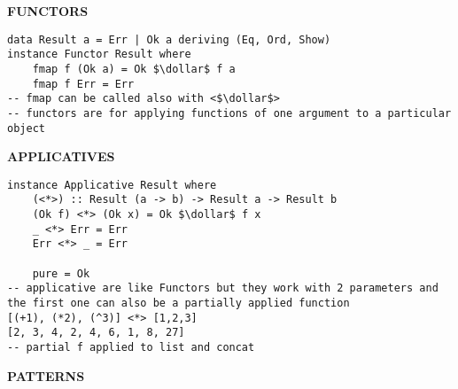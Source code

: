 \documentclass{article}
\newcommand{\dollar}{\mbox{\textdollar}}
\begin{document}
\begin{multicols*}{3}
\hrulefill

\textbf{FUNCTORS}
\begin{lstlisting}
data Result a = Err | Ok a deriving (Eq, Ord, Show)
instance Functor Result where
    fmap f (Ok a) = Ok $\dollar$ f a
    fmap f Err = Err
-- fmap can be called also with <$\dollar$>
-- functors are for applying functions of one argument to a particular object
\end{lstlisting}

\hrulefill

\textbf{APPLICATIVES}
\begin{lstlisting}
instance Applicative Result where
    (<*>) :: Result (a -> b) -> Result a -> Result b
    (Ok f) <*> (Ok x) = Ok $\dollar$ f x
    _ <*> Err = Err
    Err <*> _ = Err

    pure = Ok
-- applicative are like Functors but they work with 2 parameters and the first one can also be a partially applied function
[(+1), (*2), (^3)] <*> [1,2,3]
[2, 3, 4, 2, 4, 6, 1, 8, 27]
-- partial f applied to list and concat
\end{lstlisting}

\hrulefill

\textbf{PATTERNS}
\begin{lstlisting}
\end{lstlisting}

\end{multicols*}
\end{document}
